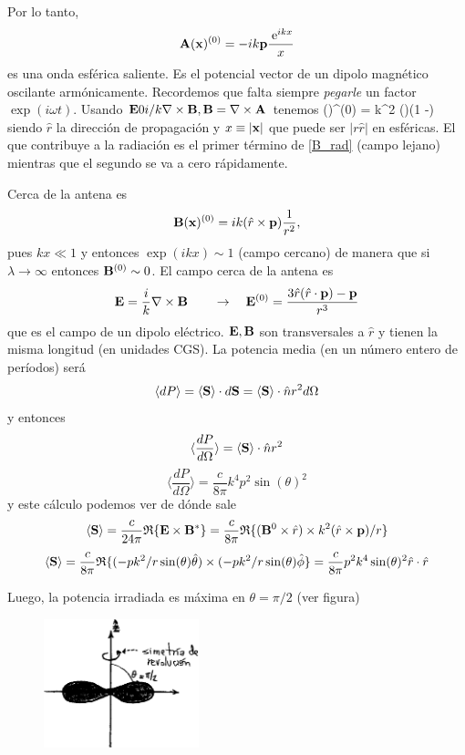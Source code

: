\documentclass[10pt,oneside]{CBFT_book}
\begin{document}
Por lo tanto,
\[
	\vb{A}(\vb{x})^{(0)} = - i k \vb{p} \frac{\euler^{ikx}}{x}
\]
es una onda esférica saliente. Es el potencial vector  de un dipolo magnético oscilante armónicamente.
Recordemos que falta siempre {\it pegarle} un factor $\exp(i\omega t)$. Usando $\vb{E} 0 i/k \rotorm{B}, 
\vb{B} = \rotorm{A}$ tenemos 
\be
	()^{(0)} = k^2 (\times{})\left(1 -\right)
	\label{B_rad}
\ee
siendo $\hat{r}$ la dirección de propagación y $x\equiv|\vb{x}|$ que puede ser $|r\hat{r}|$ en esféricas.
El que contribuye a la radiación es el primer término de \eqref{B_rad} (campo lejano) mientras que el segundo
se va a cero rápidamente.

Cerca de la antena es 
\[
	\vb{B}(\vb{x})^{(0)} = i k (\hat{r}\times\vb{p})\frac{1}{r^2}, 
\]
pues $kx\ll 1$ y entonces $\exp(ikx) \sim 1$ (campo cercano) de manera que si $\lambda \to \infty$ entonces
$\vb{B}^{(0)} \sim 0$. El campo  cerca de la antena es
\[
	\vb{E} = \frac{i}{k}\rotorm{B} \qquad \rightarrow \quad 
	\vb{E}^{(0)} = \frac{3\hat{r}(\hat{r}\cdot\vb{p}) - \vb{p}}{r^3}
\]
que es el campo de un dipolo eléctrico. $\vb{E},\vb{B}$ son transversales a $\hat{r}$ y tienen la misma 
longitud (en unidades CGS).
La potencia media (en un número entero de períodos) será 
\[
	\langle dP \rangle = \langle\vb{S}\rangle\cdot d\vb{S} = \langle \vb{S}\rangle\cdot\hat{n}r^2 d\Omega
\]
y entonces
\[
	\langle\frac{dP}{d\Omega}\rangle = \langle\vb{S}\rangle\cdot\hat{n}r^2 
\]
\[
	\langle\frac{dP}{d\Omega}\rangle = \frac{c}{8\pi} k^4 p^2 \sin(\theta)^2 
\]
y este cálculo podemos ver de dónde sale 
\[
	\langle\vb{S}\rangle = \frac{c}{2 4 \pi} \re\{ \vb{E}\times\vb{B}^* \} =
		\frac{c}{8\pi} \re\{ ( \vb{B}^0 \times \hat{r} )\times k^2(\hat{r} \times \vb{p})/r \}
\]
\[
	\langle\vb{S}\rangle =
	\frac{c}{8\pi} \re\{(-p k^2/r \sin(\theta) \hat{\theta})\times(-p k^2/r\sin(\theta)\hat{\phi} \}
	= \frac{c}{8\pi} p^2 k^4 \sin(\theta)^2 \hat{r}\cdot\hat{r}
\]

Luego, la potencia irradiada es máxima en $\theta=\pi/2$ (ver figura)

\begin{figure}[htb]
	\begin{center}
	\includegraphics[width=0.4\textwidth]{images/fig_ft1_pot_irrad.pdf}	 
	\end{center}
	\caption{}
\end{figure} 
\end{document}

